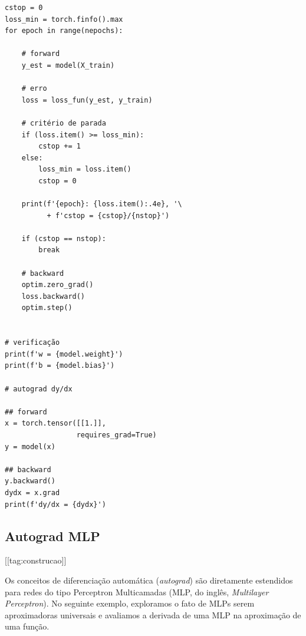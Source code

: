 \begin{ex}
\begin{lstlisting}[caption=autograd\_percep.py]
cstop = 0
loss_min = torch.finfo().max
for epoch in range(nepochs):

    # forward
    y_est = model(X_train)

    # erro
    loss = loss_fun(y_est, y_train)

    # critério de parada
    if (loss.item() >= loss_min):
        cstop += 1
    else:
        loss_min = loss.item()
        cstop = 0

    print(f'{epoch}: {loss.item():.4e}, '\
          + f'cstop = {cstop}/{nstop}')

    if (cstop == nstop):
        break

    # backward
    optim.zero_grad()
    loss.backward()
    optim.step()


# verificação
print(f'w = {model.weight}')
print(f'b = {model.bias}')

# autograd dy/dx

## forward
x = torch.tensor([[1.]],
                 requires_grad=True)
y = model(x)

## backward
y.backward()
dydx = x.grad
print(f'dy/dx = {dydx}')
\end{lstlisting}
\end{ex}

\subsection{Autograd MLP}

[[tag:construcao]]

Os conceitos de diferenciação automática (\emph{autograd}) são diretamente estendidos para redes do tipo Perceptron Multicamadas (MLP, do inglês, \textit{Multilayer Perceptron}). No seguinte exemplo, exploramos o fato de MLPs serem aproximadoras universais e avaliamos a derivada de uma MLP na aproximação de uma função.

